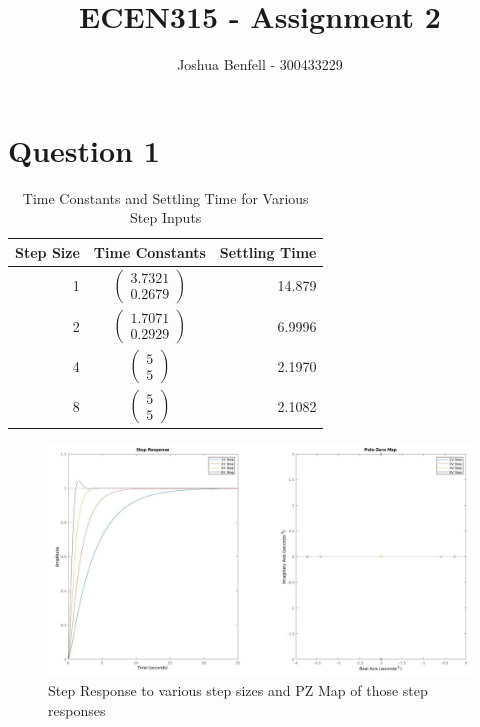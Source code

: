 \documentclass[a4paper, 12pt]{article}
\title{ECEN315 - Assignment 2}
\author{Joshua Benfell - 300433229}
\begin{document}
    \maketitle

    \section{Question 1}
        
        
        \begin{table}[!h]
            \caption{Time Constants and Settling Time for Various Step Inputs}
            \label{tab:q1}
            \centering
            \begin{tabular}{r|c|r}
                Step Size & Time Constants & Settling Time\\
                \hline
                1 & $\begin{pmatrix} 3.7321 \\ 0.2679 \end{pmatrix}$ & 14.879\\
                2 & $\begin{pmatrix} 1.7071 \\ 0.2929 \end{pmatrix}$ & 6.9996\\
                4 & $\begin{pmatrix} 5 \\ 5 \end{pmatrix}$ & 2.1970\\
                8 & $\begin{pmatrix} 5 \\ 5 \end{pmatrix}$ & 2.1082

            \end{tabular}
        \end{table}

        \begin{figure}[!h]
            \centering
            \includegraphics[width=\textwidth]{q1.jpg}
            \caption{Step Response to various step sizes and PZ Map of those step responses}
            \label{fig:q1}
        \end{figure}
\end{document}
